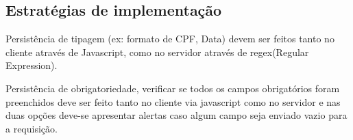 \subsection{Estratégias de implementação}
\begin{alineascomponto}
	\item Persistência de tipagem (ex: formato de CPF, Data) devem ser feitos 
tanto no cliente através de Javascript, como no servidor através de 
regex(Regular Expression).
	\item Persistência de obrigatoriedade, verificar se todos os campos 
obrigatórios foram  preenchidos deve ser feito tanto no cliente via javascript 
como no servidor e nas duas opções deve-se apresentar alertas caso algum campo 
seja enviado vazio para a requisição.
    
\end{alineascomponto}
